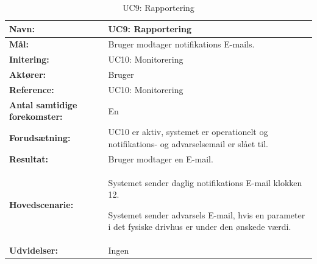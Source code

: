 \begin{table}[h]
\begin{tabularx}{\textwidth}{| >{\raggedright\arraybackslash}p{3.3 cm} | >{\raggedright\arraybackslash}X |} \hline

\textbf{Navn:} 						& UC9: Rapportering\\ \hline
\textbf{Mål:}						& Bruger modtager notifikations E-mails. \\ \hline
\textbf{Initering:}					& UC10: Monitorering \\ \hline
\textbf{Aktører:} 					& Bruger \\ \hline
\textbf{Reference:} 					& UC10: Monitorering \\ \hline
\textbf{Antal samtidige forekomster:} & En \\ \hline
\textbf{Forudsætning:} 				& UC10 er aktiv, systemet er operationelt og notifikations- og advarselsemail er slået til. \\ \hline
\textbf{Resultat:}					& Bruger modtager en E-mail. \\ \hline
\textbf{Hovedscenarie:}				& 

\begin{packed_enum}
\item Systemet sender daglig notifikations E-mail klokken 12.
\item Systemet sender advarsels E-mail, hvis en parameter i det fysiske drivhus er under den ønskede værdi. 
\end{packed_enum}
\\ \hline
\textbf{Udvidelser:}				&  
Ingen \\ \hline
\end{tabularx}
\caption{UC9: Rapportering}
\label{tbl:UC9}
\end{table}

\clearpage
 

